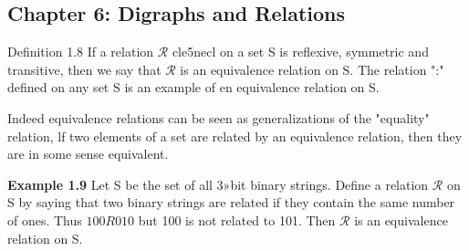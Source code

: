 \documentclass[]{article}
\begin{document}
\subsection*{Chapter 6: Digraphs and Relations}
Definition 1.8 If a relation $\mathcal{R}$ cle5necl on a set S is reflexive, symmetric and transitive, 
then we say that $\mathcal{R}$ is an equivalence relation on S.
The relation ":" defined on any set S is an example of en equivalence relation
on S. 

Indeed equivalence relations can be seen as generalizations of the "equality"
relation, lf two elements of a set are related by an equivalence relation, then they
are in some sense equivalent.



\noindent \textbf{Example 1.9} Let S be the set of all 3»bit binary strings. Define a relation $\mathcal{R}$ on
S by saying that two binary strings are related if they contain the same number
of ones. Thus $100 R 010$ but 100 is not related to 101. Then $\mathcal{R}$ is an equivalence
relation on S.
\end{document}
